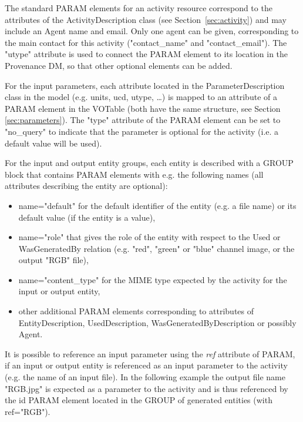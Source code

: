 
The standard PARAM elements for an activity resource correspond to the attributes of the ActivityDescription class (see Section~\ref{sec:activity}) and may include an Agent name and email. Only one agent can be given, corresponding to the main contact for this activity ("contact\_name" and "contact\_email"). 
The "utype" attribute is used to connect the PARAM element to its location in the Provenance DM, so that other optional elements can be added.

For the input parameters, each attribute located in the ParameterDescription class in the model (e.g. units, ucd, utype, \dots) is mapped to an attribute of a PARAM element in the VOTable (both have the same structure, see Section \ref{sec:parameters}).
The "type" attribute of the PARAM element can be set to "no\_query" to indicate that the parameter is optional for the activity (i.e. a default value will be used).


For the input and output entity groups, each entity is described with a GROUP block that contains PARAM elements with e.g. the following names (all attributes describing the entity are optional):
\begin{itemize}
 \item name="default" for the default identifier of the entity (e.g. a file name) or its default value (if the entity is a value),
 \item name="role" that gives the role of the entity with respect to the Used or WasGeneratedBy relation (e.g. "red", "green" or "blue" channel image, or the output "RGB" file),
 \item name="content\_type" for the MIME type expected by the activity for the input or output entity,
 \item other additional PARAM elements corresponding to attributes of EntityDescription, UsedDescription, WasGeneratedByDescription or possibly Agent.
 \end{itemize} 
It is possible to reference an input parameter using the \emph{ref} attribute of PARAM, if an input or output entity is referenced as an input parameter to the activity (e.g. the name of an input file). In the following example the output file name "RGB.jpg" is expected as a parameter to the activity and is thus referenced by the id PARAM element located in the GROUP of generated entities (with ref="RGB").

